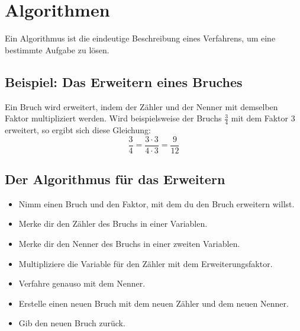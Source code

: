 \section{Algorithmen}
\label{sec:Algorithmus}

Ein Algorithmus ist die eindeutige Beschreibung eines Verfahrens, um eine bestimmte Aufgabe zu lösen.

\subsection*{Beispiel: Das Erweitern eines Bruches}

Ein Bruch wird erweitert, indem der Zähler und der Nenner mit demselben Faktor multipliziert werden. Wird beispielsweise der Bruchs $\frac{3}{4}$ mit dem Faktor $3$ erweitert, so ergibt sich diese Gleichung:
\[
\frac{3}{4} = \frac{3 \cdot 3}{4 \cdot 3} = \frac{9}{12}
\]

\subsection*{Der Algorithmus für das Erweitern}

\begin{itemize}
	\item Nimm einen Bruch und den Faktor, mit dem du den Bruch erweitern willst.
	\item Merke dir den Zähler des Bruchs in einer Variablen.
	\item Merke dir den Nenner des Bruchs in einer zweiten Variablen.
	\item Multipliziere die Variable für den Zähler mit dem Erweiterungsfaktor.
	\item Verfahre genauso mit dem Nenner.
	\item Erstelle einen neuen Bruch mit dem neuen Zähler und dem neuen Nenner.
	\item Gib den neuen Bruch zurück.
\end{itemize}